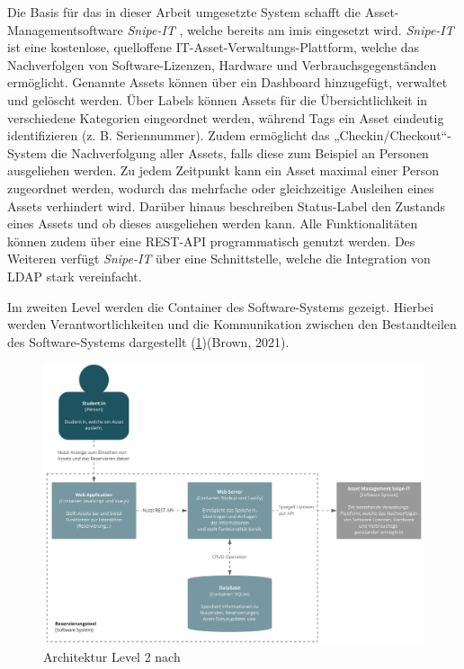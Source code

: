 Die Basis für das in dieser Arbeit umgesetzte System schafft die Asset-Managementsoftware
\textit{Snipe-IT} \cite{noauthor_home_nodate}, welche bereits am \ac{imis} eingesetzt wird.
\textit{Snipe-IT} ist eine kostenlose, quelloffene IT-Asset-Verwaltungs-Plattform, welche das
Nachverfolgen von Software-Lizenzen, Hardware und Verbrauchsgegenständen ermöglicht. Genannte Assets
können über ein Dashboard hinzugefügt, verwaltet und gelöscht werden. Über Labels können Assets für
die Übersichtlichkeit in verschiedene Kategorien eingeordnet werden, während Tags ein Asset
eindeutig identifizieren (z. B. Seriennummer). Zudem ermöglicht das „Checkin/Checkout“-System die
Nachverfolgung aller Assets, falls diese zum Beispiel an Personen ausgeliehen werden. Zu jedem
Zeitpunkt kann ein Asset maximal einer Person zugeordnet werden, wodurch das mehrfache oder
gleichzeitige Ausleihen eines Assets verhindert wird. Darüber hinaus beschreiben Status-Label den
Zustands eines Assets und ob dieses ausgeliehen werden kann. Alle Funktionalitäten können zudem über
eine REST-API programmatisch genutzt werden. Des Weiteren verfügt \textit{Snipe-IT} über eine
Schnittstelle, welche die Integration von LDAP stark vereinfacht.

    {\sffamily\color{maincolor}{Level 2: Container}}
\label{subsec:level2}
Im zweiten Level werden die Container des Software-Systems gezeigt. Hierbei
werden Verantwortlichkeiten und die Kommunikation zwischen den Bestandteilen des
Software-Systems dargestellt (\ref{fig:level2})(Brown, 2021).

\begin{figure}[h]
    \centering
    \includegraphics[scale=0.47]{Bilder/C4_2.pdf}
    \caption[Architektur Level 2]{Architektur Level 2 nach
        }
    \label{fig:level2}
\end{figure}

